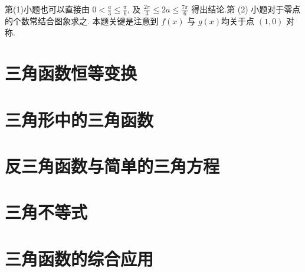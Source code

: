 \begin{note}
	第(1)小题也可以直接由 $0<\frac{a}{3} \leqslant \frac{\pi}{6}$, 及 $\frac{2 \pi}{3} \leqslant 2 a \leqslant \frac{7 \pi}{6}$ 得出结论.第 (2) 小题对于零点的个数常结合图象求之. 本题关键是注意到 $f(x)$ 与 $g(x)$均关于点 $(1,0)$ 对称.
\end{note}



\section{三角函数恒等变换}
\section{三角形中的三角函数}
\section{反三角函数与简单的三角方程}
\section{三角不等式}
\section{三角函数的综合应用}